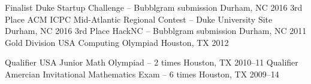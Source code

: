 \begin{cvhonors}
  \cvhonor
    {Finalist}
    {Duke Startup Challenge -- Bubblgram submission}
    {Durham, NC}
    {2016}
  \cvhonor
    {3rd Place}
    {ACM ICPC Mid-Atlantic Regional Contest -- Duke University Site}
    {Durham, NC}
    {2016}
  \cvhonor
    {3rd Place}
    {HackNC -- Bubblgram submission }
    {Durham, NC}
    {2011}
  \cvhonor
    {Gold Division}
    {USA Computing Olympiad}
    {Houston, TX}
    {2012}
\end{cvhonors}

\begin{cvhonors}
  \cvhonor
    {Qualifier}
    {USA Junior Math Olympiad -- 2 times}
    {Houston, TX}
    {2010--11}
  \cvhonor
    {Qualifier}
    {Amercian Invitational Mathematics Exam -- 6 times}
    {Houston, TX}
    {2009--14}
\end{cvhonors}
